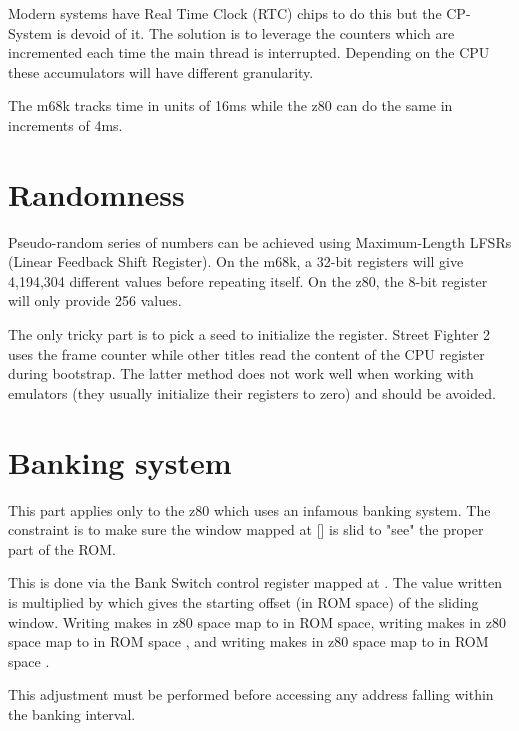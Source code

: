 Modern systems have Real Time Clock (RTC) chips to do this but the CP-System is devoid of it. The solution is to leverage the counters which are incremented each time the main thread is interrupted. Depending on the CPU these accumulators will have different granularity.

The m68k tracks time in units of 16ms while the z80 can do the same in increments of 4ms.


\section{Randomness}
Pseudo-random series of numbers can be achieved using Maximum-Length LFSRs (Linear Feedback Shift Register). On the m68k, a 32-bit registers will give 4,194,304 different values before repeating itself. On the z80, the 8-bit register will only provide 256 values.

The only tricky part is to pick a seed to initialize the register. Street Fighter 2 uses the frame counter while other titles read the content of the CPU register during bootstrap. The latter method does not work well when working with emulators (they usually initialize their registers to zero) and should be avoided.

\section{Banking system}
\label{memory_bank_programming}
This part applies only to the z80 which uses an infamous banking system. The constraint is to make sure the window mapped at [] is slid to "see" the proper part of the ROM. 

This is done via the Bank Switch control register mapped at . The value written is multiplied by  which gives the starting offset (in ROM space) of the sliding window. Writing  makes  in z80 space map to  in ROM space, writing  makes  in z80 space map to  in ROM space , and writing  makes  in z80 space map to  in ROM space .
 
This adjustment must be performed before accessing any address falling within the banking interval. 